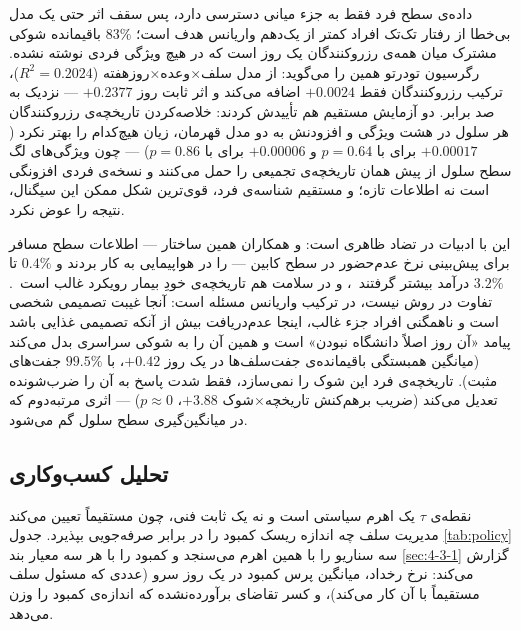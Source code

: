 داده‌ی سطح فرد فقط به جزء میانی دسترسی دارد، پس سقف اثر حتی یک مدل بی‌خطا از رفتار
تک‌تک افراد کمتر از یک‌دهم واریانس هدف است؛ $83\%$ باقیمانده شوکی مشترک میان همه‌ی
رزروکنندگان یک روز است که در هیچ ویژگی فردی نوشته نشده. رگرسیون تودرتو همین را می‌گوید:
از مدل سلف×وعده×روزهفته ($R^2 = 0.2024$)، ترکیب رزروکنندگان فقط $+0.0024$ اضافه می‌کند و
اثر ثابت روز $+0.2377$ — نزدیک به صد برابر. دو آزمایش مستقیم هم تأییدش کردند: خلاصه‌کردن
تاریخچه‌ی رزروکنندگان هر سلول در هشت ویژگی و افزودنش به دو مدل قهرمان، زیان هیچ‌کدام را
بهتر نکرد ($+0.00017$ برای  با $p=0.64$ و $+0.00006$ برای
 با $p=0.86$) — چون ویژگی‌های لگ سطح سلول از پیش همان تاریخچه‌ی
تجمیعی را حمل می‌کنند و نسخه‌ی فردی افزونگی است نه اطلاعات تازه؛ و  مستقیم
شناسه‌ی فرد، قوی‌ترین شکل ممکن این سیگنال، نتیجه را عوض نکرد.

این با ادبیات در تضاد ظاهری است:  و همکاران همین ساختار — اطلاعات سطح
مسافر برای پیش‌بینی نرخ عدم‌حضور در سطح کابین — را در هواپیمایی به کار بردند و $0.4\%$ تا
$3.2\%$ درآمد بیشتر گرفتند~\cite{Lawrence03noshow}، و در سلامت هم تاریخچه‌ی خودِ بیمار
رویکرد غالب است~\cite{CarrerasGarcia20noshow}. تفاوت در روش نیست، در ترکیب واریانس
مسئله است: آنجا غیبت تصمیمی شخصی است و ناهمگنی افراد جزء غالب، اینجا عدم‌دریافت بیش از
آنکه تصمیمی غذایی باشد پیامد «آن روز اصلاً دانشگاه نبودن» است و همین آن را به شوکی
سراسری بدل می‌کند (میانگین همبستگی باقیمانده‌ی جفت‌سلف‌ها در یک روز $+0.42$، با $99.5\%$
جفت‌های مثبت). تاریخچه‌ی فرد این شوک را نمی‌سازد، فقط شدت پاسخ به آن را ضرب‌شونده تعدیل
می‌کند (ضریب برهم‌کنش تاریخچه×شوک $+3.88$، $p \approx 0$) — اثری مرتبه‌دوم که در
میانگین‌گیری سطح سلول گم می‌شود.

\subsection{تحلیل کسب‌وکاری}
\label{sec:4-5-5}

نقطه‌ی $\tau$ یک اهرم سیاستی است و نه یک ثابت فنی، چون مستقیماً تعیین می‌کند مدیریت سلف
چه اندازه ریسک کمبود را در برابر صرفه‌جویی بپذیرد. جدول \ref{tab:policy} سه سناریو را
با همین اهرم می‌سنجد و کمبود را با هر سه معیار بند \ref{sec:4-3-1} گزارش می‌کند: نرخ
رخداد، میانگین پرس کمبود در یک روز سرو (عددی که مسئول سلف مستقیماً با آن کار می‌کند)، و
کسر تقاضای برآورده‌نشده که اندازه‌ی کمبود را وزن می‌دهد.

